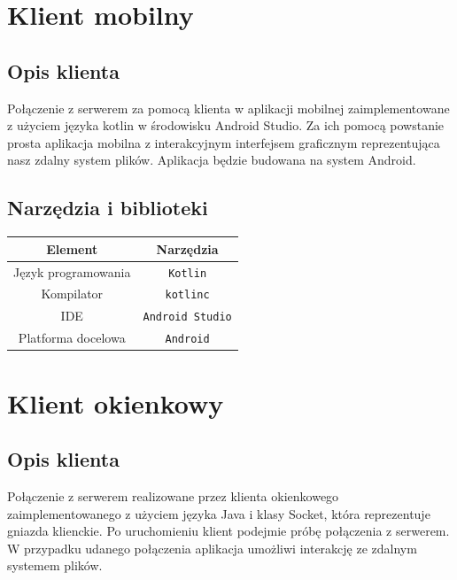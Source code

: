 \documentclass[10pt,a4paper]{article}
\begin{document}
\section{Klient mobilny}

\subsection{Opis klienta}
Połączenie z serwerem za pomocą klienta w aplikacji mobilnej zaimplementowane z użyciem języka kotlin w środowisku Android Studio. Za ich pomocą powstanie prosta aplikacja mobilna z interakcyjnym interfejsem graficznym reprezentująca nasz zdalny system plików. Aplikacja będzie budowana na system Android.

\subsection{Narzędzia i biblioteki}
\bgroup
    \begin{center}
        \def\arraystretch{1.3}
        \begin{tabular}{c|c}
            \textbf{Element} & \textbf{Narzędzia} \\
            \hline
            Język programowania & \texttt{Kotlin} \\
            \hline
            Kompilator & \texttt{kotlinc} \\
            \hline
            IDE & \texttt{Android Studio} \\
            \hline
            Platforma docelowa & \texttt{Android}
        \end{tabular}
    \end{center}
\egroup

\section{Klient okienkowy}

\subsection{Opis klienta}
Połączenie z serwerem realizowane przez klienta okienkowego zaimplementowanego z użyciem języka Java i klasy Socket, która reprezentuje gniazda klienckie. Po uruchomieniu klient podejmie próbę połączenia z serwerem. W przypadku udanego połączenia aplikacja umożliwi interakcję ze zdalnym systemem plików.  
\end{document}

